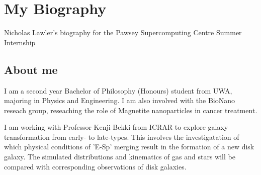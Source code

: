 \section{My Biography}

Nicholas Lawler's biography for the Pawsey Supercomputing Centre Summer Internship

\subsection{About me}
I am a second year Bachelor of Philosophy (Honours) student from UWA, majoring in Physics and Engineering. I am also involved with the BioNano reseach group, reseaching the role of Magnetite nanoparticles in cancer treatment. 

I am working with Professor Kenji Bekki from ICRAR to explore galaxy transformation from early- to late-types. This involves the investigatation of which physical conditions of 'E-Sp' merging result in the formation of a new disk galaxy. The simulated distributions and kinematics of gas and stars will be compared with corresponding observations of disk galaxies.
